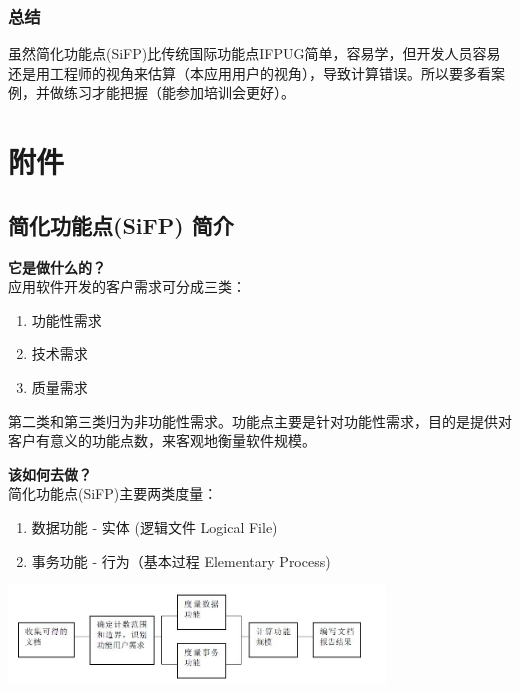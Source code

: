 \hypertarget{ux603bux7ed3}{%
\subsubsection{总结}\label{ux603bux7ed3}}

虽然简化功能点(SiFP)比传统国际功能点IFPUG简单，容易学，但开发人员容易还是用工程师的视角来估算（本应用用户的视角），导致计算错误。所以要多看案例，并做练习才能把握（能参加培训会更好）。

\hypertarget{ux9644ux4ef6}{%
\section{附件}\label{ux9644ux4ef6}}

\hypertarget{ux7b80ux5316ux529fux80fdux70b9sifp-ux7b80ux4ecb}{%
\subsection{简化功能点(SiFP)
简介}\label{ux7b80ux5316ux529fux80fdux70b9sifp-ux7b80ux4ecb}}

 \textbf{它是做什么的？} \\
应用软件开发的客户需求可分成三类：

\begin{enumerate}
\tightlist
\item
  功能性需求
\item
  技术需求
\item
  质量需求
\end{enumerate}

第二类和第三类归为非功能性需求。功能点主要是针对功能性需求，目的是提供对客户有意义的功能点数，来客观地衡量软件规模。

 \textbf{该如何去做？} \\
简化功能点(SiFP)主要两类度量：

\begin{enumerate}
\tightlist
\item
  数据功能 - 实体 (逻辑文件 Logical File)
\item
  事务功能 - 行为（基本过程 Elementary Process)
\end{enumerate}


\includegraphics[width=10cm]{功能点计数过程.jpg}

